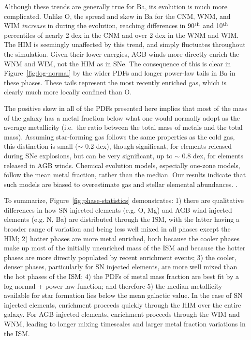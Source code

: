 \documentclass[twocolumn]{aastex61}
\begin{document}

Although these trends are generally true for Ba, its evolution is much more complicated.
Unlike O, the spread and skew in Ba for the CNM, WNM, and WIM \textit{increase} in during the evolution, reaching differences in 90$^{\rm th}$ and 10$^{\rm th}$ percentiles of nearly 2 dex in the CNM and over 2 dex in the WNM and WIM. The HIM is seemingly unaffected by this trend, and simply fluctuates throughout the simulation. Given their lower energies, AGB winds more directly enrich the WNM and WIM, not the HIM as in SNe. The consequence of this is clear in Figure~\ref{fig:log-normal} by the wider PDFs and longer power-law tails in Ba in these phases. These tails represent the most recently enriched gas, 
        which
is clearly much more locally confined than O.

The positive skew in all of the PDFs presented here implies that most of the mass of the galaxy has a metal fraction below what one would normally adopt as the average metallicity (i.e.\ the ratio between the total mass of metals and the total mass). Assuming star-forming gas follows the same properties as the cold gas, this distinction is small ($\sim$ 0.2 dex), 
   though 
significant, for elements released during SNe explosions, but can be very significant, up to $\sim$ 0.8 dex, for elements released in AGB winds. Chemical evolution models, especially one-zone models, follow the mean metal fraction, rather than the median. 
            Our results indicate that such
models are biased to overestimate gas and stellar elemental abundances.
. %

To summarize, Figure~\ref{fig:phase-statistics} demonstrates: 1) there are qualitative differences in how SN injected elements (e.g. O, Mg) and AGB wind injected elements (e.g. N, Ba) are distributed through the ISM, with the latter having a broader range of variation and being less well mixed in all phases except the HIM; 2) hotter phases are more metal enriched, both because the cooler phases make up most of the initially unenriched mass of the ISM and because the hotter phases are more directly populated by recent enrichment events; 3) the cooler, denser phases, particularly for SN injected elements, are more well mixed than the hot phases of the ISM; 4) the PDFs of metal mass fraction are best fit by a log-normal + power law function; and therefore 5) the median metallicity available for star formation 
lies below the mean galactic value. In the case of SN injected elements, enrichment proceeds quickly through the HIM over the entire galaxy. For AGB injected elements, enrichment proceeds through the WIM and WNM, leading to longer mixing timescales and larger metal fraction variations in the ISM.
\end{document}
